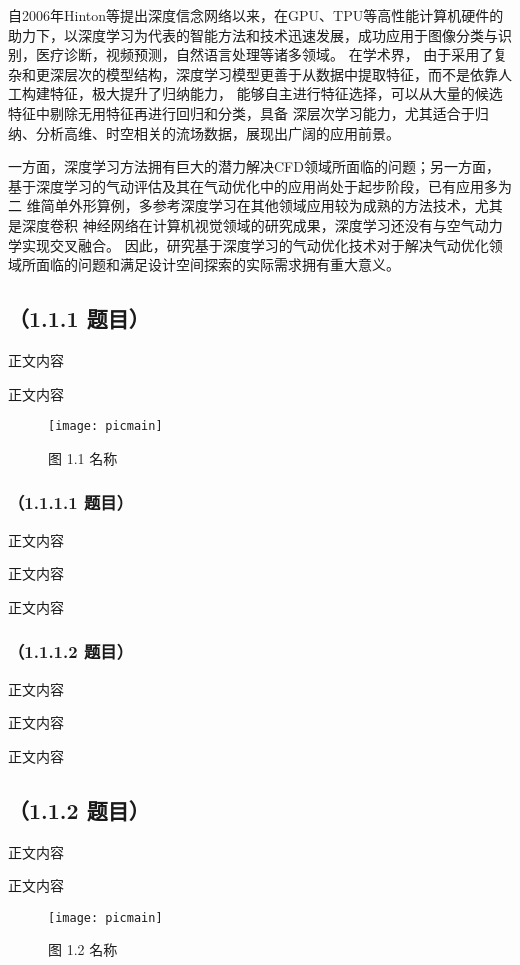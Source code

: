 自2006年Hinton等提出深度信念网络\cite{深度信念网络}以来，在GPU、TPU等高性能计算机硬件的助力下，以深度学习为代表的智能方法和技术迅速发展，成功应用于图像分类与识别，医疗诊断，视频预测，自然语言处理等诸多领域。
在学术界，
由于采用了复杂和更深层次的模型结构，深度学习模型更善于从数据中提取特征，而不是依靠人工构建特征，极大提升了归纳能力，
能够自主进行特征选择，可以从大量的候选特征中剔除无用特征再进行回归和分类，具备
深层次学习能力，尤其适合于归纳、分析高维、时空相关的流场数据，展现出广阔的应用前景。


一方面，深度学习方法拥有巨大的潜力解决CFD领域所面临的问题；另一方面，
基于深度学习的气动评估及其在气动优化中的应用尚处于起步阶段，已有应用多为二
维简单外形算例，多参考深度学习在其他领域应用较为成熟的方法技术，尤其是深度卷积
神经网络在计算机视觉领域的研究成果，深度学习还没有与空气动力学实现交叉融合。
因此，研究基于深度学习的气动优化技术对于解决气动优化领域所面临的问题和满足设计空间探索的实际需求拥有重大意义。



\subsection{（1.1.1 题目）}
正文内容

正文内容

\begin{figure}[htp]
\centering
\texttt{[image: picmain]}
\caption{图 1.1 名称}
\end{figure}

\subsubsection{（1.1.1.1 题目）}
正文内容

正文内容

正文内容

\subsubsection{（1.1.1.2 题目）}
正文内容

正文内容

正文内容

\subsection{（1.1.2 题目）}
正文内容

正文内容

\begin{figure}[htp]
\centering
\texttt{[image: picmain]}
\caption{图 1.2 名称}
\end{figure}

